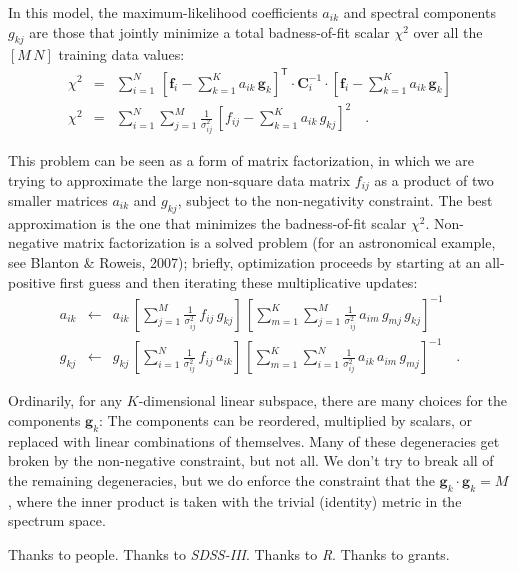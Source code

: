 \documentclass[preprint]{aastex}
\newcommand{\project}[1]{\textsl{#1}}
\newcommand{\mmatrix}[1]{\boldsymbol{#1}}
\newcommand{\inverse}[1]{{#1}^{-1}}
\newcommand{\transpose}[1]{{#1}^{\mathsf{T}}}
\newcommand{\covar}{\mmatrix{C}}
\newcommand{\fvec}{\mmatrix{f}}
\newcommand{\gvec}{\mmatrix{g}}
\newcommand{\invvar}{\inverse{\covar}}
\begin{document}
In this model, the maximum-likelihood coefficients $a_{ik}$ and
spectral components $g_{kj}$ are those that jointly minimize a total
badness-of-fit scalar $\chi^2$ over all the $[M\,N]$ training data
values:
\begin{eqnarray}\displaystyle
\chi^2 &=& \sum_{i=1}^N 
 \,\transpose{\left[\fvec_i - \sum_{k=1}^K a_{ik}\,\gvec_k\right]}
 \cdot\invvar_i\cdot\left[\fvec_i - \sum_{k=1}^K a_{ik}\,\gvec_k\right]
 \nonumber\\
\chi^2 &=& \sum_{i=1}^N \sum_{j=1}^M \frac{1}{\sigma_{ij}^2}
 \,\left[f_{ij} - \sum_{k=1}^K a_{ik}\,g_{kj}\right]^2
\quad .
\end{eqnarray}

This problem can be seen as a form of matrix factorization, in which
we are trying to approximate the large non-square data matrix $f_{ij}$
as a product of two smaller matrices $a_{ik}$ and $g_{kj}$, subject to
the non-negativity constraint.  The best approximation is the one that
minimizes the badness-of-fit scalar $\chi^2$.  Non-negative matrix
factorization is a solved problem (for an astronomical example, see
Blanton \& Roweis, 2007); briefly, optimization proceeds by starting
at an all-positive first guess and then iterating these multiplicative
updates:
\begin{eqnarray}\displaystyle
a_{ik} &\leftarrow& a_{ik}
 \,\left[\sum_{j=1}^M\frac{1}{\sigma_{ij}^2}\,f_{ij}\,g_{kj}\right]
 \,\left[\sum_{m=1}^K\sum_{j=1}^M\frac{1}{\sigma_{ij}^2}\,a_{im}\,g_{mj}\,g_{kj}\right]^{-1}
\nonumber\\
g_{kj} &\leftarrow& g_{kj}
 \,\left[\sum_{i=1}^N\frac{1}{\sigma_{ij}^2}\,f_{ij}\,a_{ik}\right]
 \,\left[\sum_{m=1}^K\sum_{i=1}^N\frac{1}{\sigma_{ij}^2}\,a_{ik}\,a_{im}\,g_{mj}\right]^{-1}
\quad .
\end{eqnarray}

Ordinarily, for any $K$-dimensional linear subspace, there are many
choices for the components $\gvec_k$: The components can be reordered,
multiplied by scalars, or replaced with linear combinations of
themselves.  Many of these degeneracies get broken by the non-negative
constraint, but not all.  We don't try to break all of the remaining
degeneracies, but we do enforce the constraint that the
$\gvec_k\cdot\gvec_k=M$, where the inner product is taken with the
trivial (identity) metric in the spectrum space.

\acknowledgements Thanks to people.  Thanks to \project{SDSS-III}.
Thanks to \project{R}.  Thanks to grants.
\end{document}
